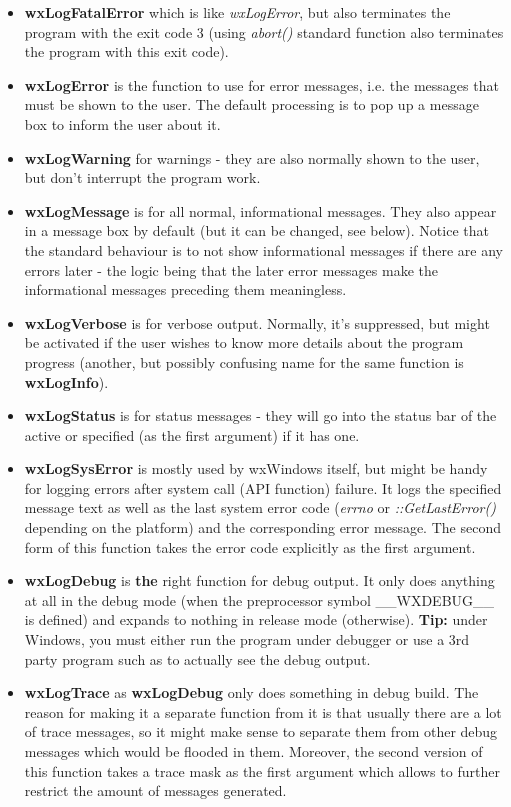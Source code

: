 \begin{itemize}\itemsep=0pt
\item{\bf wxLogFatalError} which is like {\it wxLogError}, but also
terminates the program with the exit code 3 (using {\it abort()} standard
function also terminates the program with this exit code).
\item{\bf wxLogError} is the function to use for error messages, i.e. the
messages that must be shown to the user. The default processing is to pop up a
message box to inform the user about it.
\item{\bf wxLogWarning} for warnings - they are also normally shown to the
user, but don't interrupt the program work.
\item{\bf wxLogMessage} is for all normal, informational messages. They also
appear in a message box by default (but it can be changed, see below). Notice
that the standard behaviour is to not show informational messages if there are
any errors later - the logic being that the later error messages make the
informational messages preceding them meaningless.
\item{\bf wxLogVerbose} is for verbose output. Normally, it's suppressed, but
might be activated if the user wishes to know more details about the program
progress (another, but possibly confusing name for the same function is {\bf
wxLogInfo}).
\item{\bf wxLogStatus} is for status messages - they will go into the status
bar of the active or specified (as the first argument)  if it has one.
\item{\bf wxLogSysError} is mostly used by wxWindows itself, but might be
handy for logging errors after system call (API function) failure. It logs the
specified message text as well as the last system error
code ({\it errno} or {\it ::GetLastError()} depending on the platform) and the corresponding error
message. The second form of this function takes the error code explicitly as the
first argument.
\item{\bf wxLogDebug} is {\bf the} right function for debug output. It only
does anything at all in the debug mode (when the preprocessor symbol
\_\_WXDEBUG\_\_ is defined) and expands to nothing in release mode (otherwise).
{\bf Tip:} under Windows, you must either run the program under debugger or
use a 3rd party program such as  
to actually see the debug output.
\item{\bf wxLogTrace} as {\bf wxLogDebug} only does something in debug
build. The reason for making it a separate function from it is that usually
there are a lot of trace messages, so it might make sense to separate them
from other debug messages which would be flooded in them. Moreover, the second
version of this function takes a trace mask as the first argument which allows
to further restrict the amount of messages generated.
\end{itemize}

